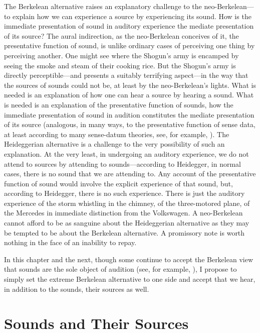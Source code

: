 The Berkelean alternative raises an explanatory challenge to the neo-Berkelean---\-to explain how we can experience a source by experiencing its sound. How is the immediate presentation of sound in auditory experience the mediate presentation of its source? The aural indirection, as the neo-Berkelean conceives of it, the presentative function of sound, is unlike ordinary cases of perceiving one thing by perceiving another. One might see where the Shogun's army is encamped by seeing the smoke and steam of their cooking rice. But the Shogun's army is directly perceptible---and presents a suitably terrifying aspect---in the way that the sources of sounds could not be, at least by the neo-Berkelean's lights. What is needed is an explanation of how one can hear a source by hearing a sound. What is needed is an explanation of the presentative function of sounds, how the immediate presentation of sound in audition constitutes the mediate presentation of its source (analogous, in many ways, to the presentative function of sense data, at least according to many sense-datum theories, see, for example, \citealt{Price:1932fk}). The Heideggerian alternative is a challenge to the very possibility of such an explanation. At the very least, in undergoing an auditory experience, we do not attend to sources by attending to sounds---according to Heidegger, in normal cases, there is no sound that we are attending to. Any account of the presentative function of sound would involve the explicit experience of that sound, but, according to Heidegger, there is no such experience. There is just the auditory experience of the storm whistling in the chimney, of the three-motored plane, of the Mercedes in immediate distinction from the Volkswagen. A neo-Berkelean cannot afford to be as sanguine about the Heideggerian alternative as they may be tempted to be about the Berkelean alternative. A promissory note is worth nothing in the face of an inability to repay.

In this chapter and the next, though some continue to accept the Berkelean view that sounds are the sole object of audition (see, for example, \citealt{Smith:2002sa}), I propose to simply set the extreme Berkelean alternative to one side and accept that we hear, in addition to the sounds, their sources as well. 


\section{Sounds and Their Sources} %
\label{sec:sounds_and_their_sources}

